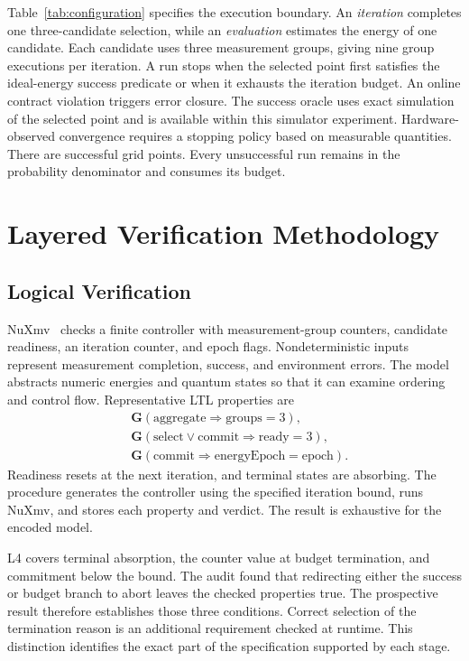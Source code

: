 \documentclass[conference]{IEEEtran}
\begin{document}
Table~\ref{tab:configuration} specifies the execution boundary. An \emph{iteration} completes one three-candidate selection, while an \emph{evaluation} estimates the energy of one candidate. Each candidate uses three measurement groups, giving nine group executions per iteration. A run stops when the selected point first satisfies the ideal-energy success predicate or when it exhausts the iteration budget. An online contract violation triggers error closure. The success oracle uses exact simulation of the selected point and is available within this simulator experiment. Hardware-observed convergence requires a stopping policy based on measurable quantities. There are \SuccessPoints successful grid points. Every unsuccessful run remains in the probability denominator and consumes its budget.

\section{Layered Verification Methodology}
\label{sec:methods}
\subsection{Logical Verification}
NuXmv~\cite{nuxmv} checks a finite controller with measurement-group counters, candidate readiness, an iteration counter, and epoch flags. Nondeterministic inputs represent measurement completion, success, and environment errors. The model abstracts numeric energies and quantum states so that it can examine ordering and control flow. Representative LTL properties are
\begin{align}
 &\mathbf G(\mathrm{aggregate}\Rightarrow\mathrm{groups}=3),\nonumber\\
 &\mathbf G(\mathrm{select}\lor\mathrm{commit}\Rightarrow\mathrm{ready}=3),\nonumber\\
 &\mathbf G(\mathrm{commit}\Rightarrow\mathrm{energyEpoch}=\mathrm{epoch}).
 \label{eq:logical}
\end{align}
Readiness resets at the next iteration, and terminal states are absorbing. The procedure generates the controller using the specified iteration bound, runs NuXmv, and stores each property and verdict. The result is exhaustive for the encoded model.

L4 covers terminal absorption, the counter value at budget termination, and commitment below the bound. The audit found that redirecting either the success or budget branch to abort leaves the checked properties true. The prospective result therefore establishes those three conditions. Correct selection of the termination reason is an additional requirement checked at runtime. This distinction identifies the exact part of the specification supported by each stage.
\end{document}
